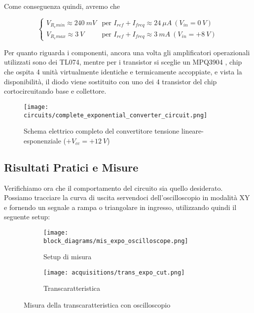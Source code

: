 Come conseguenza quindi, avremo che

\begin{equation}\label{vreminmax}
    \left\{
    \begin{array}{ll}
        V_{R_emin}\approx240\ mV & \text{per  } I_{ref}+I_{freq}\approx24\ \mu A\ (V_{in}=0\ V) \\
        V_{R_emax}\approx3\ V    & \text{per } I_{ref}+I_{freq}\approx3\ mA\ (V_{in}=+8\ V)
    \end{array}
    \right.
\end{equation}

Per quanto riguarda i componenti, ancora una volta gli amplificatori operazionali utilizzati
sono dei TL074, mentre per i transistor si sceglie un MPQ3904 \cite{mpq3904}, chip che
ospita 4 unità virtualmente identiche e termicamente accoppiate, e vista la disponibilità, il
diodo viene sostituito con uno dei 4 transistor del chip cortocircuitando base e collettore.

\begin{figure}[H]
    \centering
    \texttt{[image: circuits/complete\_exponential\_converter\_circuit.png]}
    \caption{Schema elettrico completo del convertitore tensione lineare-esponenziale ($+V_{cc}=+12\ V$)}
    \label{complete_exponential_converter_circuit}
\end{figure}


\subsection*{Risultati Pratici e Misure}


Verifichiamo ora che il comportamento del circuito sia quello desiderato. Possiamo tracciare
la curva di uscita servendoci dell'oscilloscopio in modalità XY e fornendo un segnale a rampa
o triangolare in ingresso, utilizzando quindi il seguente setup:

\begin{figure}[H]
    \centering

    \begin{subfigure}{.5\textwidth}
        \centering
        \texttt{[image: block\_diagrams/mis\_expo\_oscilloscope.png]}
        \caption{Setup di misura}
        \label{mis_expo_oscilloscope}
    \end{subfigure}%
    \begin{subfigure}{.5\textwidth}
        \centering
        \texttt{[image: acquisitions/trans\_expo\_cut.png]}
        \caption{Transcaratteristica}
        \label{expo_transcharacteristic}
    \end{subfigure}

    \caption{Misura della transcaratteristica con oscilloscopio}
\end{figure}

